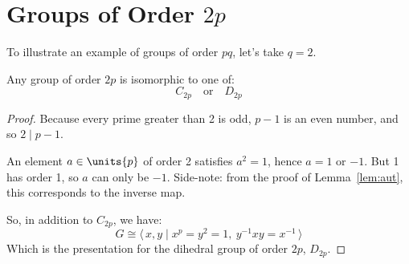 \section{Groups of Order \(2p\)}
To illustrate an example of groups of order \(pq\), let's take \(q = 2\).
\begin{theorem}
    Any group of order \(2p\) is isomorphic to one of:
    \[C_{2p} \quad \text{or} \quad D_{2p}\]
\end{theorem}

\begin{proof}
Because every prime greater than 2 is odd, \(p - 1\) is an even number, and so \(2 \mid p - 1\).

An element \(a \in \units{p}\) of order 2 satisfies \(a^2 = 1\), hence \(a = 1\) or \(-1\).
But 1 has order 1, so \(a\) can only be \(-1\).
Side-note: from the proof of Lemma~\ref{lem:aut}, this corresponds to the inverse map.

So, in addition to \(C_{2p}\), we have:
\[G \cong \langle\, x, y \mid x^p = y^2 = 1,\ y^{-1}xy = x^{-1}\,\rangle\]
Which is the presentation for the dihedral group of order \(2p\), \(D_{2p}\).
\end{proof}
